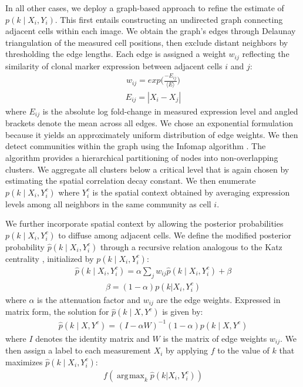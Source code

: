 \documentclass[10pt,letterpaper]{article}
\DeclareMathOperator*{\argmax}{\arg\!\max} %
\begin{document}
In all other cases, we deploy a graph-based approach to refine the estimate of $p(k \mid X_i,Y_i)$. This first entails constructing an undirected graph connecting adjacent cells within each image. We obtain the graph's edges through Delaunay triangulation of the measured cell positions, then exclude distant neighbors by thresholding the edge lengths. Each edge is assigned a weight $w_{ij}$ reflecting the similarity of clonal marker expression between adjacent cells $i$ and $j$:
\begin{eqnarray}
w_{ij} = exp \big( \frac{-E_{ij}}{\langle E \rangle} \big)
\end{eqnarray}
\begin{eqnarray}
E_{ij} = | X_i - X_j | 
\end{eqnarray}
where $E_{ij}$ is the absolute log fold-change in measured expression level and angled brackets denote the mean across all edges. We chose an exponential formulation because it yields an approximately uniform distribution of edge weights. We then detect communities within the graph using the Infomap algorithm \cite{Rosvall2009}. The algorithm provides a hierarchical partitioning of nodes into non-overlapping clusters. We aggregate all clusters below a critical level that is again chosen by estimating the spatial correlation decay constant. We then enumerate $p(k \mid X_i,Y_i^c)$ where $Y_i^c$ is the spatial context obtained by averaging expression levels among all neighbors in the same community as cell $i$.

We further incorporate spatial context by allowing the posterior probabilities $p(k \mid X_i,Y_i^c)$ to diffuse among adjacent cells. We define the modified posterior probability $\hat{p}(k \mid X_i,Y_i^c)$ through a recursive relation analogous to the Katz centrality \cite{Katz1953}, initialized by $p(k \mid X_i,Y_i^c)$:
\begin{eqnarray}
\hat{p}(k \mid X_i, Y^c_i) = \alpha \sum_{j}{w_{ij} \hat{p}(k \mid X_i, Y^c _i)} + \beta
\end{eqnarray}
\begin{eqnarray}
\beta = (1-\alpha) p(k| X_i,Y^c_i)
\end{eqnarray}
where $\alpha$ is the attenuation factor and $w_{ij}$ are the edge weights. Expressed in matrix form, the solution for $\hat{p}(k \mid X,Y^c)$ is given by:
\begin{eqnarray}
\hat{p}(k \mid X,Y^c) = ( I - \alpha W )^{-1} (1-\alpha)p(k \mid X, Y^c)
\end{eqnarray}
where $I$ denotes the identity matrix and $W$ is the matrix of edge weights $w_{ij}$. We then assign a label to each measurement $X_i$ by applying $f$ to the value of $k$ that maximizes $\hat{p}(k \mid X_i,Y_i^c)$:
\begin{eqnarray}
f(\argmax_{k} \hat{p}(k | X_i, Y^c_i))
\end{eqnarray}
\end{document}
